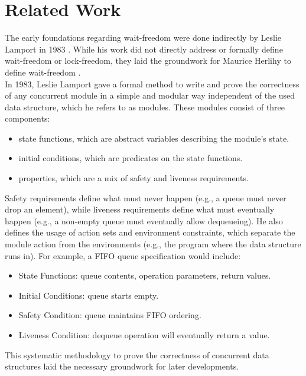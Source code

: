 \chapter{Related Work}\label{ch:related-work}

The early foundations regarding wait-freedom were done indirectly by Leslie Lamport in 1983 \cite{Lamport1983SPSCCircularBuffer}. While his work did not directly address or formally define wait-freedom or lock-freedom, they laid the groundwork for Maurice Herlihy to define wait-freedom \cite{herlihy1991wait}. \\
In 1983, Leslie Lamport gave a formal method to write and prove the correctness of any concurrent module in a simple and modular way independent of the used data structure, which he refers to as modules. These modules consist of three components: 
\begin{itemize}
   \item state functions, which are abstract variables describing the module's state.
   \item initial conditions, which are predicates on the state functions.
   \item properties, which are a mix of safety and liveness requirements.
\end{itemize}
Safety requirements define what must never happen (e.g., a queue must never drop an element), while liveness requirements define what must eventually happen (e.g., a non-empty queue must eventually allow dequeueing). He also defines the usage of action sets and environment constraints, which separate the module action from the environments (e.g., the program where the data structure runs in). For example, a \ac{FIFO} queue specification would include:
\begin{itemize}
   \item State Functions: queue contents, operation parameters, return values.
   \item Initial Conditions: queue starts empty.
   \item Safety Condition: queue maintains \ac{FIFO} ordering.
   \item Liveness Condition: dequeue operation will eventually return a value.
\end{itemize}
This systematic methodology to prove the correctness of concurrent data structures laid the necessary groundwork for later developments. \cite{Lamport1983SPSCCircularBuffer}


